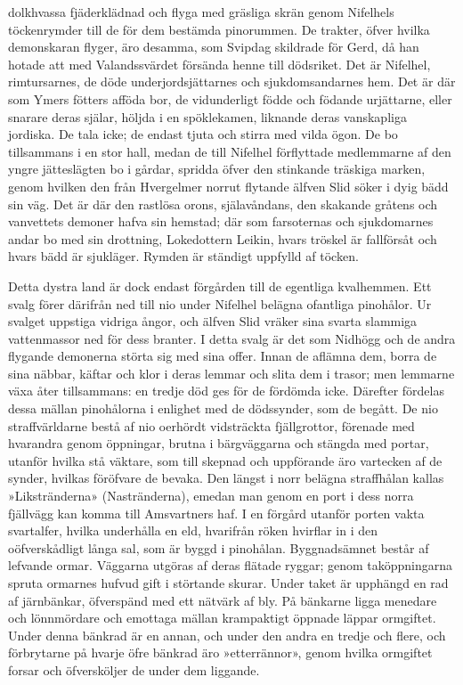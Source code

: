 dolkhvassa fjäderklädnad och flyga med gräsliga skrän genom Nifelhels
töckenrymder till de för dem bestämda pinorummen. De trakter, öfver
hvilka demonskaran flyger, äro desamma, som Svipdag skildrade för Gerd,
då han hotade att med Valandssvärdet försända henne till dödsriket. Det
är Nifelhel, rimtursarnes, de döde underjordsjättarnes och
sjukdomsandarnes hem. Det är där som Ymers fötters afföda bor, de
vidunderligt födde och födande urjättarne, eller snarare deras själar,
höljda i en spöklekamen, liknande deras vanskapliga jordiska. De tala
icke; de endast tjuta och stirra med vilda ögon. De bo tillsammans i en
stor hall, medan de till Nifelhel förflyttade medlemmarne af den yngre
jätteslägten bo i gårdar, spridda öfver den stinkande träskiga marken,
genom hvilken den från Hvergelmer norrut flytande älfven Slid söker i
dyig bädd sin väg. Det är där den rastlösa orons, själavåndans, den
skakande gråtens och vanvettets demoner hafva sin hemstad; där som
farsoternas och sjukdomarnes andar
\protect\hypertarget{lb1625905.xhtmlux5cux23start188}{}{}\protect\hypertarget{lb1625905.xhtmlux5cux23start188-a}{}{}\protect\hypertarget{lb1625905.xhtmlux5cux23start188-b}{}{}\protect\hypertarget{lb1625905.xhtmlux5cux23start188-c}{}{}\protect\hypertarget{lb1625905.xhtmlux5cux23start188-d}{}{}
bo med sin drottning, Lokedottern Leikin, hvars tröskel är fallförsåt
och hvars bädd är sjukläger. Rymden är ständigt uppfylld af töcken.

Detta dystra land är dock endast förgården till de egentliga kvalhemmen.
Ett svalg förer därifrån ned till nio under Nifelhel belägna ofantliga
pinohålor. Ur svalget uppstiga vidriga ångor, och älfven Slid vräker
sina svarta slammiga vattenmassor ned för dess branter. I detta svalg är
det som Nidhögg och de andra flygande demonerna störta sig med sina
offer. Innan de aflämna dem, borra de sina näbbar, käftar och klor i
deras lemmar och slita dem i trasor; men lemmarne växa åter tillsammans:
en tredje död ges för de fördömda icke. Därefter fördelas dessa mällan
pinohålorna i enlighet med de dödssynder, som de begått. De nio
straffvärldarne bestå af nio oerhördt vidsträckta fjällgrottor, förenade
med hvarandra genom öppningar, brutna i bärgväggarna och stängda med
portar, utanför hvilka stå väktare, som till skepnad och uppförande äro
vartecken af de synder, hvilkas föröfvare de bevaka. Den längst i norr
belägna straffhålan kallas »Likstränderna» (Nastränderna), emedan man
genom en port i dess norra fjällvägg kan komma till Amsvartners haf. I
en förgård utanför porten vakta svartalfer, hvilka underhålla en eld,
hvarifrån röken hvirflar in i den oöfverskådligt långa sal, som är byggd
i pinohålan. Byggnadsämnet består af lefvande ormar. Väggarna utgöras af
deras flätade ryggar; genom taköppningarna spruta ormarnes hufvud gift i
störtande skurar. Under taket är upphängd en rad af järnbänkar,
öfverspänd med ett nätvärk af bly. På bänkarne ligga menedare och
lönnmördare och emottaga mällan krampaktigt öppnade läppar ormgiftet.
Under denna bänkrad är en annan, och under den andra en tredje och
flere, och förbrytarne på hvarje öfre bänkrad äro »etterrännor», genom
hvilka ormgiftet forsar och öfversköljer de under dem liggande.

